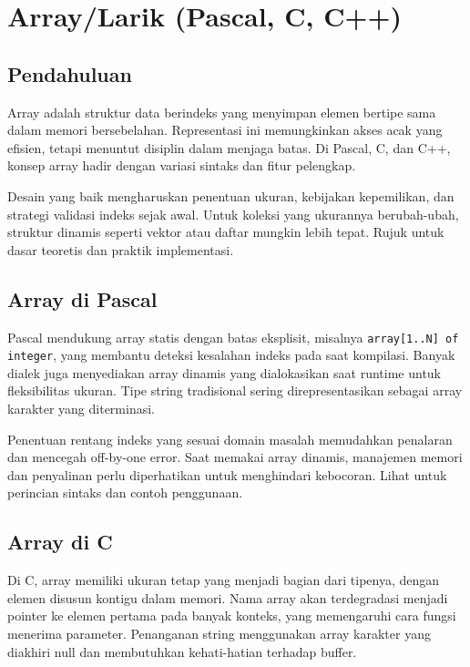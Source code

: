 \documentclass[../main.tex]{subfiles}
\begin{document}
\chapter{Array/Larik (Pascal, C, C++)}
\section{Pendahuluan}
Array adalah struktur data berindeks yang menyimpan elemen bertipe sama dalam memori bersebelahan. Representasi ini memungkinkan akses acak yang efisien, tetapi menuntut disiplin dalam menjaga batas. Di Pascal, C, dan C++, konsep array hadir dengan variasi sintaks dan fitur pelengkap.

Desain yang baik mengharuskan penentuan ukuran, kebijakan kepemilikan, dan strategi validasi indeks sejak awal. Untuk koleksi yang ukurannya berubah-ubah, struktur dinamis seperti vektor atau daftar mungkin lebih tepat. Rujuk \textcite{pascal-tutorial-wikibooks,iso-c-draft-n1570,cpp-reference} untuk dasar teoretis dan praktik implementasi.

\section{Array di Pascal}
Pascal mendukung array statis dengan batas eksplisit, misalnya \texttt{array[1..N] of integer}, yang membantu deteksi kesalahan indeks pada saat kompilasi. Banyak dialek juga menyediakan array dinamis yang dialokasikan saat runtime untuk fleksibilitas ukuran. Tipe string tradisional sering direpresentasikan sebagai array karakter yang diterminasi.

Penentuan rentang indeks yang sesuai domain masalah memudahkan penalaran dan mencegah off-by-one error. Saat memakai array dinamis, manajemen memori dan penyalinan perlu diperhatikan untuk menghindari kebocoran. Lihat \textcite{free-pascal-docs,pascal-tutorial-wikibooks} untuk perincian sintaks dan contoh penggunaan.

\section{Array di C}
Di C, array memiliki ukuran tetap yang menjadi bagian dari tipenya, dengan elemen disusun kontigu dalam memori. Nama array akan terdegradasi menjadi pointer ke elemen pertama pada banyak konteks, yang memengaruhi cara fungsi menerima parameter. Penanganan string menggunakan array karakter yang diakhiri null dan membutuhkan kehati-hatian terhadap buffer.
\end{document}
